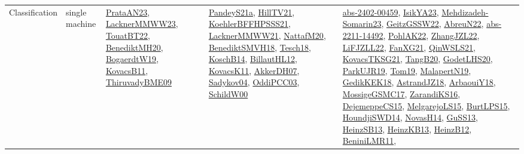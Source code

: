 {\begin{longtable}{lp{3cm}>{\raggedright}p{6cm}>{\raggedright}p{6cm}p{8cm}}
Classification & single machine & \href{articles/PrataAN23.pdf}{PrataAN23}\cite{PrataAN23}, \href{articles/LacknerMMWW23.pdf}{LacknerMMWW23}\cite{LacknerMMWW23}, \href{papers/TouatBT22.pdf}{TouatBT22}\cite{TouatBT22}, \href{articles/BenediktMH20.pdf}{BenediktMH20}\cite{BenediktMH20}, \href{papers/BogaerdtW19.pdf}{BogaerdtW19}\cite{BogaerdtW19}, \href{articles/KovacsB11.pdf}{KovacsB11}\cite{KovacsB11}, \href{papers/ThiruvadyBME09.pdf}{ThiruvadyBME09}\cite{ThiruvadyBME09} & \href{articles/PandeyS21a.pdf}{PandeyS21a}\cite{PandeyS21a}, \href{papers/HillTV21.pdf}{HillTV21}\cite{HillTV21}, \href{articles/KoehlerBFFHPSSS21.pdf}{KoehlerBFFHPSSS21}\cite{KoehlerBFFHPSSS21}, \href{papers/LacknerMMWW21.pdf}{LacknerMMWW21}\cite{LacknerMMWW21}, \href{papers/NattafM20.pdf}{NattafM20}\cite{NattafM20}, \href{papers/BenediktSMVH18.pdf}{BenediktSMVH18}\cite{BenediktSMVH18}, \href{papers/Tesch18.pdf}{Tesch18}\cite{Tesch18}, \href{papers/KoschB14.pdf}{KoschB14}\cite{KoschB14}, \href{papers/BillautHL12.pdf}{BillautHL12}\cite{BillautHL12}, \href{articles/KovacsK11.pdf}{KovacsK11}\cite{KovacsK11}, \href{papers/AkkerDH07.pdf}{AkkerDH07}\cite{AkkerDH07}, \href{papers/Sadykov04.pdf}{Sadykov04}\cite{Sadykov04}, \href{papers/OddiPCC03.pdf}{OddiPCC03}\cite{OddiPCC03}, \href{articles/SchildW00.pdf}{SchildW00}\cite{SchildW00} & \href{articles/abs-2402-00459.pdf}{abs-2402-00459}\cite{abs-2402-00459}, \href{articles/IsikYA23.pdf}{IsikYA23}\cite{IsikYA23}, \href{papers/Mehdizadeh-Somarin23.pdf}{Mehdizadeh-Somarin23}\cite{Mehdizadeh-Somarin23}, \href{papers/GeitzGSSW22.pdf}{GeitzGSSW22}\cite{GeitzGSSW22}, \href{articles/AbreuN22.pdf}{AbreuN22}\cite{AbreuN22}, \href{articles/abs-2211-14492.pdf}{abs-2211-14492}\cite{abs-2211-14492}, \href{articles/PohlAK22.pdf}{PohlAK22}\cite{PohlAK22}, \href{papers/ZhangJZL22.pdf}{ZhangJZL22}\cite{ZhangJZL22}, \href{papers/LiFJZLL22.pdf}{LiFJZLL22}\cite{LiFJZLL22}, \href{articles/FanXG21.pdf}{FanXG21}\cite{FanXG21}, \href{articles/QinWSLS21.pdf}{QinWSLS21}\cite{QinWSLS21}, \href{papers/KovacsTKSG21.pdf}{KovacsTKSG21}\cite{KovacsTKSG21}, \href{papers/TangB20.pdf}{TangB20}\cite{TangB20}, \href{papers/GodetLHS20.pdf}{GodetLHS20}\cite{GodetLHS20}, \href{papers/ParkUJR19.pdf}{ParkUJR19}\cite{ParkUJR19}, \href{papers/Tom19.pdf}{Tom19}\cite{Tom19}, \href{papers/MalapertN19.pdf}{MalapertN19}\cite{MalapertN19}, \href{articles/GedikKEK18.pdf}{GedikKEK18}\cite{GedikKEK18}, \href{papers/AstrandJZ18.pdf}{AstrandJZ18}\cite{AstrandJZ18}, \href{papers/ArbaouiY18.pdf}{ArbaouiY18}\cite{ArbaouiY18}, \href{papers/MossigeGSMC17.pdf}{MossigeGSMC17}\cite{MossigeGSMC17}, \href{articles/ZarandiKS16.pdf}{ZarandiKS16}\cite{ZarandiKS16}, \href{papers/DejemeppeCS15.pdf}{DejemeppeCS15}\cite{DejemeppeCS15}, \href{papers/MelgarejoLS15.pdf}{MelgarejoLS15}\cite{MelgarejoLS15}, \href{papers/BurtLPS15.pdf}{BurtLPS15}\cite{BurtLPS15}, \href{papers/HoundjiSWD14.pdf}{HoundjiSWD14}\cite{HoundjiSWD14}, \href{articles/NovasH14.pdf}{NovasH14}\cite{NovasH14}, \href{papers/GuSS13.pdf}{GuSS13}\cite{GuSS13}, \href{articles/HeinzSB13.pdf}{HeinzSB13}\cite{HeinzSB13}, \href{papers/HeinzKB13.pdf}{HeinzKB13}\cite{HeinzKB13}, \href{papers/HeinzB12.pdf}{HeinzB12}\cite{HeinzB12}, \href{articles/BeniniLMR11.pdf}{BeniniLMR11}\cite{BeniniLMR11}, 
\end{longtable}}
